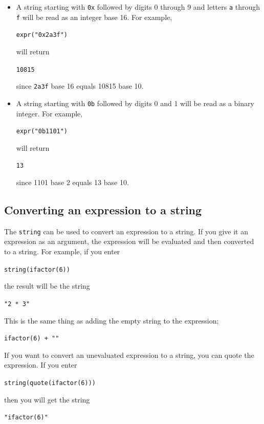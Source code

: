 \documentclass[a4paper,11pt]{book}
\begin{document}
\begin{itemize}
  \item
  A string starting with \texttt{0x} followed by digits 0 through 9
  and letters \texttt{a} through \texttt{f} will be read as an integer
  base 16.  For example,
  \begin{center}
    {\tt expr("0x2a3f")}
  \end{center}
  will return
  \begin{center}
    {\tt 10815}
  \end{center}
  since \texttt{2a3f} base 16 equals 10815 base 10.
  
  \item
  A string starting with \texttt{0b} followed by digits 0 and 1 will
  be read as a binary integer.  For example,
  \begin{center}
    {\tt expr("0b1101")}
  \end{center}
  will return
  \begin{center}
    {\tt 13}
  \end{center}
  since 1101 base 2 equals 13 base 10.
\end{itemize}

\subsection{Converting an expression to a string}

The \texttt{string} can be used to convert an expression
to a string.  If you give it an expression as an argument, the
expression will be evaluated and then converted to a string.  For
example, if you enter
\begin{center}
  {\tt string(ifactor(6))}
\end{center}
the result will be the string
\begin{center}
  {\tt "2 * 3"}
\end{center}
This is the same thing as adding the empty string to the expression;
\begin{center}
  {\tt ifactor(6) + ""}
\end{center}

If you want to convert an unevaluated expression to a string, you can
quote the expression.  If you enter
\begin{center}
  {\tt string(quote(ifactor(6)))}
\end{center}
then you will get the string
\begin{center}
  {\tt "ifactor(6)"}
\end{center}
\end{document}

